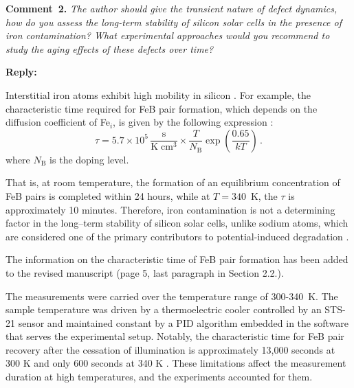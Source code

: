 \documentclass[a4paper,fleqn]{cas-sc}
\begin{document}
\vspace{1cm}
\noindent
\textcolor[rgb]{0.00,0.50,1.00}{\textbf{Comment~2.}}
\emph{ The author should give the transient nature of defect dynamics, how do you assess the long-term stability of silicon solar cells in the presence of iron contamination? What experimental approaches would you recommend to study the aging effects of these defects over time?}


\noindent
\textcolor[rgb]{0.51,0.00,0.00}{\textbf{Reply:}}

Interstitial iron atoms exhibit high mobility in silicon \cite{Istratov1999}.
For example, the characteristic time required for FeB pair formation,
which depends on the diffusion coefficient of Fe$_i$, is given by the following expression \cite{FeBAssJAP2014,FeBKin2019,FeBAssSST2011}:
\begin{equation}
\label{eqTass}
\tau=5.7\times10^5\,\frac{\mathrm{s}}{\mathrm{K}\;\mathrm{cm}^3}\times\frac{T}{N_\mathrm{B}}\exp\left(\frac{0.65}{kT}\right)\,.
\end{equation}
where
$N_\mathrm{B}$ is the doping level.

That is, at room temperature, the formation of an equilibrium concentration of FeB pairs is completed within 24 hours,
while at $T=340$~K, the $\tau$ is approximately 10 minutes.
Therefore, iron contamination is not a determining factor in the long--term stability of silicon solar cells, unlike sodium atoms, which are considered one
of the primary contributors to potential-induced degradation \cite{Yamaguchi2021}.


The information on the characteristic time of FeB pair formation has been added to the revised manuscript (page 5, last paragraph in Section 2.2.).

\begin{mdframed}
The measurements were carried over the temperature range of 300-340~K.
The sample temperature was driven by a thermoelectric cooler controlled by an STS-21 sensor
and maintained constant by a PID algorithm embedded in the software that serves the experimental setup.
\textcolor[rgb]{1.00,0.07,0.00}{Notably, the characteristic time for FeB pair recovery after the cessation of illumination is approximately 13,000 seconds at 300 K
and only 600 seconds at 340 K \cite{FeBAssJAP2014,FeBKin2019}.
These limitations affect the measurement duration at high temperatures, and the experiments accounted for them.}
\end{mdframed}
\end{document}
